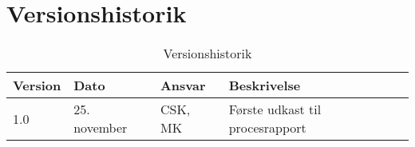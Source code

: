 \chapter{Versionshistorik}\label{Versionshistorik}

\begin{table}[h]
\centering
\begin{tabular}{|l|l|l| p{}|}
\hline
\textbf{Version} &  \textbf{Dato} &  \textbf{Ansvar} & \textbf{Beskrivelse}\\\hline
1.0 & 25. november & CSK, MK & Første udkast til procesrapport \\\hline
\end{tabular}
\caption{Versionshistorik}
\end{table}